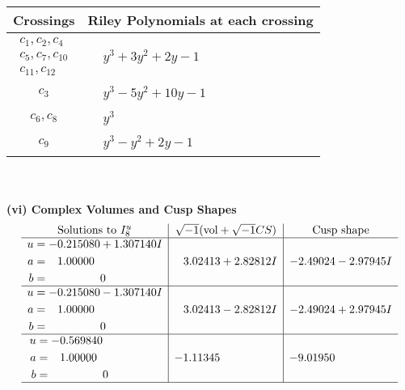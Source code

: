 \documentclass[1p]{elsarticle_modified}
\theoremstyle{definition}
\newcommand{\I}{\sqrt{-1}}
\begin{document}
\begin{tabular}{m{50pt}|m{274pt}}
Crossings & \hspace{64pt}Riley Polynomials at each crossing \\
\hline $$\begin{aligned}c_{1},c_{2},c_{4}\\c_{5},c_{7},c_{10}\\c_{11},c_{12}\end{aligned}$$&$\begin{aligned}
&y^3+3 y^2+2 y-1
\end{aligned}$\\
\hline $$\begin{aligned}c_{3}\end{aligned}$$&$\begin{aligned}
&y^3-5 y^2+10 y-1
\end{aligned}$\\
\hline $$\begin{aligned}c_{6},c_{8}\end{aligned}$$&$\begin{aligned}
&y^3
\end{aligned}$\\
\hline $$\begin{aligned}c_{9}\end{aligned}$$&$\begin{aligned}
&y^3- y^2+2 y-1
\end{aligned}$\\
\hline
\end{tabular}\\~\\
\newpage\flushleft \textbf{(vi) Complex Volumes and Cusp Shapes}
$$\begin{array}{c|c|c}  
\text{Solutions to }I^u_{8}& \I (\text{vol} + \sqrt{-1}CS) & \text{Cusp shape}\\
 \hline 
\begin{aligned}
u &= -0.215080 + 1.307140 I \\
a &= \phantom{-}1.00000\phantom{ +0.000000I} \\
b &= \phantom{-0.000000 } 0\end{aligned}
 & \phantom{-}3.02413 + 2.82812 I & -2.49024 - 2.97945 I \\ \hline\begin{aligned}
u &= -0.215080 - 1.307140 I \\
a &= \phantom{-}1.00000\phantom{ +0.000000I} \\
b &= \phantom{-0.000000 } 0\end{aligned}
 & \phantom{-}3.02413 - 2.82812 I & -2.49024 + 2.97945 I \\ \hline\begin{aligned}
u &= -0.569840\phantom{ +0.000000I} \\
a &= \phantom{-}1.00000\phantom{ +0.000000I} \\
b &= \phantom{-0.000000 } 0\end{aligned}
 & -1.11345\phantom{ +0.000000I} & -9.01950\phantom{ +0.000000I}\\
 \hline 
 \end{array}$$\newpage\newpage\renewcommand{\arraystretch}{1}
\end{document}
